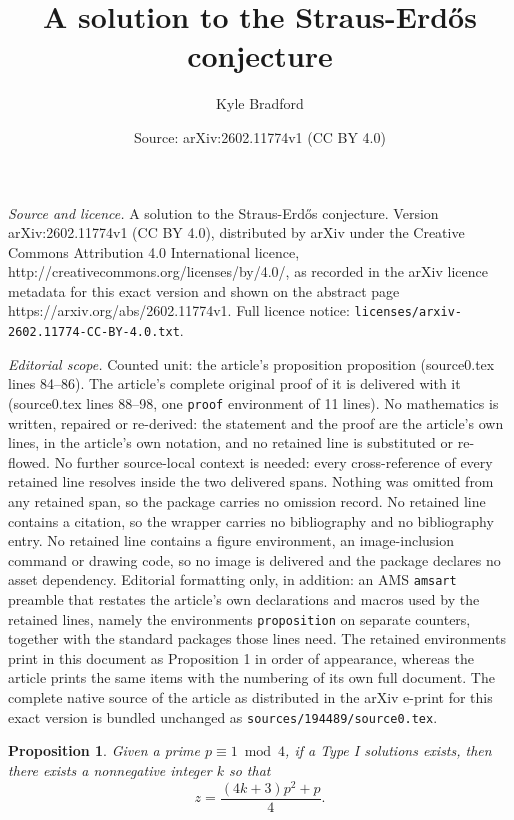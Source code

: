 \documentclass[10pt,a4paper]{amsart}
\title{A solution to the Straus-Erd\H{o}s conjecture}
\author{Kyle Bradford}
\date{Source: arXiv:2602.11774v1 (CC BY 4.0)}
\newtheorem{proposition}{Proposition}
\begin{document}
\maketitle

\noindent\emph{Source and licence.} A solution to the Straus-Erd\H{o}s conjecture. Version arXiv:2602.11774v1 (CC BY 4.0), distributed by arXiv under the Creative Commons Attribution 4.0 International licence, http://creativecommons.org/licenses/by/4.0/, as recorded in the arXiv licence metadata for this exact version and shown on the abstract page https://arxiv.org/abs/2602.11774v1. Full licence notice: \texttt{licenses/arxiv-2602.11774-CC-BY-4.0.txt}.\par\smallskip

\noindent\textit{Editorial scope.} Counted unit: the article's proposition proposition (source0.tex lines 84--86). The article's complete original proof of it is delivered with it (source0.tex lines 88--98, one \texttt{proof} environment of 11 lines). No mathematics is written, repaired or re-derived: the statement and the proof are the article's own lines, in the article's own notation, and no retained line is substituted or re-flowed.  No further source-local context is needed: every cross-reference of every retained line resolves inside the two delivered spans.  Nothing was omitted from any retained span, so the package carries no omission record.  No retained line contains a citation, so the wrapper carries no bibliography and no bibliography entry.  No retained line contains a figure environment, an image-inclusion command or drawing code, so no image is delivered and the package declares no asset dependency.  Editorial formatting only, in addition: an AMS \texttt{amsart} preamble that restates the article's own declarations and macros used by the retained lines, namely the environments \texttt{proposition} on separate counters, together with the standard packages those lines need.  The retained environments print in this document as Proposition 1 in order of appearance, whereas the article prints the same items with the numbering of its own full document.  The complete native source of the article as distributed in the arXiv e-print for this exact version is bundled unchanged as \texttt{sources/194489/source0.tex}.
\begin{proposition}
Given a prime $p \equiv 1 \bmod 4$, if a Type I solutions exists, then there exists a nonnegative integer $k$  so that $$  z= \frac{(4k+3)p^{2}+p}{4}.$$
\end{proposition}
\end{document}
